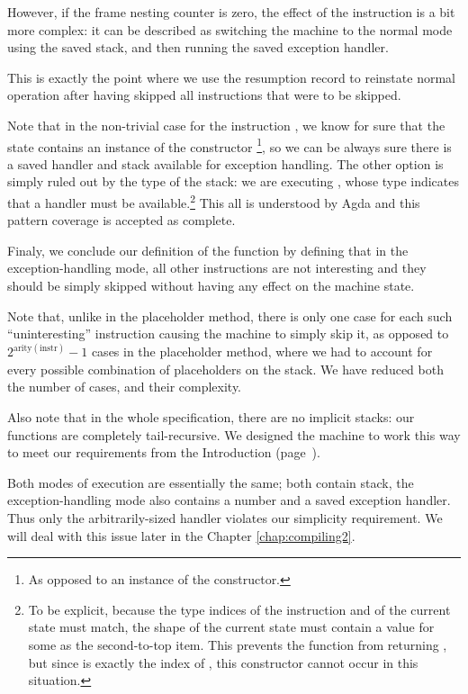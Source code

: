 However, if the frame nesting counter is zero, the effect of the instruction
 is a bit more complex: it can be described as switching the
machine to the normal mode using the saved stack, and then running the
saved exception handler.

This is exactly the point where we use the resumption record to reinstate
normal operation after having skipped all instructions that were to be skipped.

Note that in the non-trivial case for the instruction , we know
for sure that the state contains an instance of the  constructor%
\footnote{As opposed to an instance of the  constructor.}, so
we can be always sure there is a saved handler and stack available for
exception handling. The other option is simply ruled out by the type of the
stack: we are executing , whose type indicates that a handler
must be available.\footnote{To be explicit, because the type indices of the
	instruction  and of the current state must match, the shape
	of the current state must contain a value  for some 
	as the second-to-top item.  This prevents the function 
from returning , but since  is exactly the index
of , this constructor cannot occur in this situation.} This all
is understood by Agda and this pattern coverage is accepted as complete.

Finaly, we conclude our definition of the function  by
defining that in the exception-handling mode, all other instructions are not
interesting and they should be simply skipped without having any effect on the
machine state.

Note that, unlike in the placeholder method, there is only one case for each
such ``uninteresting'' instruction causing the machine to simply skip it, as
opposed to $2^{\mathrm{arity(instr)}} - 1$ cases in the placeholder method,
where we had to account for every possible combination of placeholders on the
stack. We have reduced both the number of cases, and their complexity.

Also note that in the whole specification, there are no implicit stacks: our
functions are completely tail-recursive. We designed the machine to work this
way to meet our requirements from the Introduction (page~\pageref{objectives}).

Both modes of execution are essentially the same; both contain stack, the
exception-handling mode also contains a number and a saved exception handler.
Thus only the arbitrarily-sized handler violates our simplicity requirement.
We will deal with this issue later in the Chapter \ref{chap:compiling2}.

